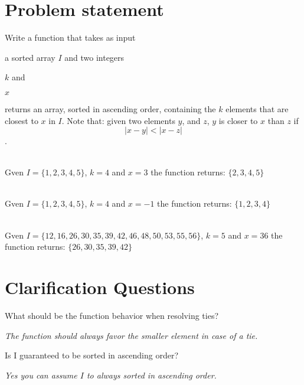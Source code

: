 \section{Problem statement}
\begin{exercise}

	Write a function that takes as input
	\begin{enumerate*}
		\item a sorted array $I$ and two integers
		\item $k$ and
		\item $x$
	\end{enumerate*}
	returns an array, sorted in ascending order, containing the $k$ elements that are closest to $x$ in $I$.
	Note that: given two elements $y$, and $z$, $y$ is closer to $x$ than $z$ if 
	\begin{equation}
		|x-y| < |x-z|
	\label{eq:kclosest_in_array:sort_criteria}
	\end{equation}.
	 

	\begin{example}
		\hfill \\
		Gven $I = \{1,2,3,4,5\}$, $k=4$ and $x = 3$ the function returns: $\{2,3,4,5\}$
	\end{example}

	\begin{example}
		\hfill \\
		Gven $I = \{1,2,3,4,5\}$, $k=4$ and $x = -1$ the function returns: $\{1,2,3,4\}$
	\end{example}

	\begin{example}
		\hfill \\
		Gven $I = \{12,16,26,30,35,39,42,46,48,50,53,55,56\}$,
		 $k=5$ and $x = 36$ the function returns: $\{26,30,35,39,42\}$
	\end{example}
\end{exercise}

\section{Clarification Questions}

\begin{QandA}
	\item What should be the function behavior when resolving ties?
	\begin{answered}
		\textit{The function should always favor the smaller element in case of a tie.}
	\end{answered}
	
	\item Is I guaranteed to be sorted in ascending order?
	\begin{answered}
		\textit{Yes you can assume $I$ to  always sorted in ascending order.}
	\end{answered}
	
\end{QandA}

